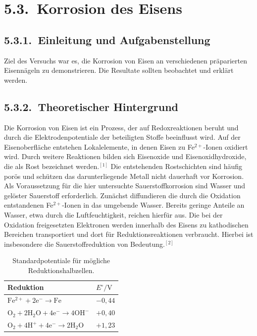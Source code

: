\documentclass[12pt,a4paper]{article}
\newcommand{\versuchsabschnitt}[2]{\subsection*{5.3.#1.\ #2}}
\begin{document}
\section*{5.3.\ Korrosion des Eisens}

\versuchsabschnitt{1}{Einleitung und Aufgabenstellung}

Ziel des Versuchs war es, die Korrosion von Eisen an verschiedenen präparierten Eisennägeln zu demonstrieren. Die Resultate sollten beobachtet und erklärt werden.

\versuchsabschnitt{2}{Theoretischer Hintergrund}

Die Korrosion von Eisen ist ein Prozess,
der auf Redoxreaktionen beruht und durch die Elektrodenpotentiale der beteiligten Stoffe beeinflusst wird. Auf der Eisenoberfläche entstehen Lokalelemente,
in denen Eisen zu Fe$^{2+}$-Ionen oxidiert wird.
Durch weitere Reaktionen bilden sich Eisenoxide und Eisenoxidhydroxide, die als Rost bezeichnet werden.$^{[1]}$
Die entstehenden Rostschichten sind häufig porös und schützen das darunterliegende Metall nicht dauerhaft vor Korrosion. 
Als Voraussetzung für die hier untersuchte Sauerstoffkorrosion sind Wasser und gelöster Sauerstoff erforderlich.
Zunächst diffundieren die durch die Oxidation entstandenen Fe$^{2+}$-Ionen in das umgebende Wasser. Bereits geringe Anteile an Wasser,
etwa durch die Luftfeuchtigkeit, reichen hierfür aus.
Die bei der Oxidation freigesetzten Elektronen werden innerhalb des Eisens zu kathodischen Bereichen transportiert und dort für Reduktionsreaktionen verbraucht.
Hierbei ist insbesondere die Sauerstoffreduktion von Bedeutung.$^{[2]}$

\begin{table}[htbp]
  \centering
  \caption{Standardpotentiale für mögliche Reduktionshalbzellen.}
  \label{tab:potentiale}
  \begingroup
  \renewcommand{\arraystretch}{1.3}
  \begin{tabularx}{0.88\linewidth}{@{}Y >{\centering\arraybackslash}p{2.2cm}@{}}
    \toprule
    Reduktion & $E^\circ/\mathrm{V}$ \\
    \midrule
    $\mathrm{Fe^{2+}+2e^-\rightarrow Fe}$ & $-0{,}44$ \\
    $\mathrm{O_2+2H_2O+4e^-\rightarrow 4OH^-}$ & $+0{,}40$ \\
    $\mathrm{O_2+4H^++4e^-\rightarrow 2H_2O}$ & $+1{,}23$ \\
    \bottomrule
  \end{tabularx}
  \endgroup
\end{table}
\end{document}
